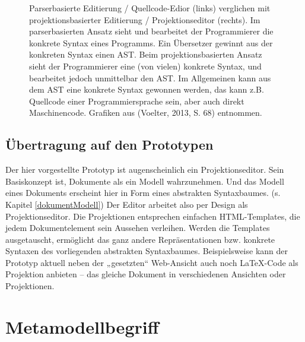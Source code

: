  
\begin{figure}[h!]
\centering
{}
\caption[Parserbasierte versus projektionsbasierte Editierung]{ Parserbasierte Editierung / Quellcode-Edior (links) verglichen mit projektionsbasierter Editierung / Projektionseditor (rechts). Im parserbasierten Ansatz sieht und bearbeitet der Programmierer die konkrete Syntax eines Programms. Ein Übersetzer gewinnt aus der konkreten Syntax einen AST. Beim projektionsbasierten Ansatz sieht der Programmierer eine (von vielen) konkrete Syntax, und bearbeitet jedoch unmittelbar den AST. Im Allgemeinen kann aus dem AST eine konkrete Syntax gewonnen werden, das kann z.B. Quellcode einer Programmiersprache sein, aber auch direkt Maschinencode. Grafiken aus (Voelter, 2013, S. 68) entnommen. }\label{parserprojectional}
\end{figure}
 
\subsection{Übertragung auf den Prototypen}\label{}
 
Der hier vorgestellte Prototyp ist augenscheinlich ein Projektionseditor. Sein Basiskonzept ist, Dokumente als ein Modell wahrzunehmen. Und das Modell eines Dokuments erscheint hier in Form eines abstrakten Syntaxbaumes. (s. Kapitel \ref{dokumentModell}) Der Editor arbeitet also per Design als Projektionseditor. Die Projektionen entsprechen einfachen HTML-Templates, die jedem Dokumentelement sein Aussehen verleihen. Werden die Templates ausgetauscht, ermöglicht das ganz andere Repräsentationen bzw. konkrete Syntaxen des vorliegenden abstrakten Syntaxbaumes. Beispielsweise kann der Prototyp aktuell neben der „gesetzten“ Web-Ansicht auch noch LaTeX-Code als Projektion anbieten -- das gleiche Dokument in verschiedenen Ansichten oder Projektionen.

 
\section{Metamodellbegriff}\label{metamodellbegriff-sec}
 
